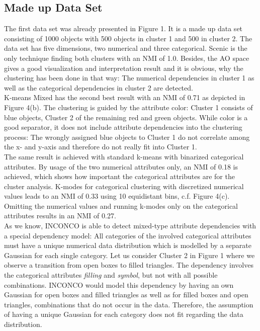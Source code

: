 \documentclass[conference]{IEEEtran}
\begin{document}
\subsection{Made up Data Set}
The first data set was already presented in Figure 1\cite{scenic}. It is a made up data set consisting of 1000 objects with 500 objects in cluster 1 and 500 in cluster 2. The data set has five dimensions, two numerical and three categorical. Scenic is the only technique finding both clusters with an NMI of 1.0. Besides, the AO space gives a good visualization and interpretation result and it is obvious, why the clustering has been done in that way: The numerical dependencies in cluster 1 as well as the categorical dependencies in cluster 2 are detected.
\\
K-means Mixed has the second best result with an NMI of 0.71 as depicted in Figure 4(b)\cite{scenic}. The clustering is guided by the attribute color: Cluster 1 consists of blue objects, Cluster 2 of the remaining red and green objects. While color is a good separator, it does not include attribute dependencies into the clustering process: The wrongly assigned blue objects to Cluster 1 do not correlate among the x- and y-axis and therefore do not really fit into Cluster 1.
\\
The same result is achieved with standard k-means with binarized categorical attributes. By usage of the two numerical attributes only, an NMI of 0.18 is achieved, which shows how important the categorical attributes are for the cluster analysis. K-modes for categorical clustering with  discretized numerical values leads to an NMI of 0.33 using 10 equidistant bins, c.f. Figure 4(c)\cite{scenic}. Omitting the numerical values and running k-modes only on the categorical attributes results in an NMI of 0.27.
\\
As we know, INCONCO is able to detect mixed-type attribute dependencies with a special dependency model: All categories of the involved categorical attributes must have a unique numerical data distribution which is modelled by a separate Gaussian for each single category. Let us consider Cluster 2 in Figure 1\cite{scenic} where we observe a transition from open boxes to filled triangles. The dependency involves the categorical attributes \textit{filling} and \textit{symbol}, but not with all possible combinations. INCONCO would model this dependency by having an own Gaussian for open boxes and filled triangles as well as for filled boxes and open triangles, combinations that do not occur in the data. Therefore, the assumption of having a unique Gaussian for each category does not fit regarding the data distribution. 
\end{document}
